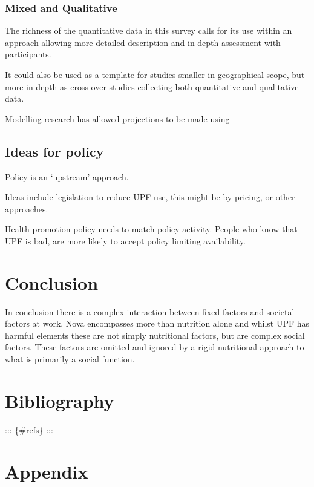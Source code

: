 \documentclass[
]{article}
\begin{document}
\hypertarget{mixed-and-qualitative}{%
\subsubsection{Mixed and Qualitative}\label{mixed-and-qualitative}}

The richness of the quantitative data in this survey calls for its use
within an approach allowing more detailed description and in depth
assessment with participants.

It could also be used as a template for studies smaller in geographical
scope, but more in depth as cross over studies collecting both
quantitative and qualitative data.

Modelling research has allowed projections to be made using

\hypertarget{ideas-for-policy}{%
\subsection{Ideas for policy}\label{ideas-for-policy}}

Policy is an `upstream' approach.

Ideas include legislation to reduce UPF use, this might be by pricing,
or other approaches.

Health promotion policy needs to match policy activity. People who know
that UPF is bad, are more likely to accept policy limiting availability.

\newpage

\hypertarget{conclusion}{%
\section{Conclusion}\label{conclusion}}

In conclusion there is a complex interaction between fixed factors and
societal factors at work. Nova encompasses more than nutrition alone and
whilst UPF has harmful elements these are not simply nutritional
factors, but are complex social factors. These factors are omitted and
ignored by a rigid nutritional approach to what is primarily a social
function. \newpage

\hypertarget{bibliography}{%
\section{Bibliography}\label{bibliography}}

::: \{\#refs\} :::

\hypertarget{appendix}{%
\section*{Appendix}\label{appendix}}
\end{document}
